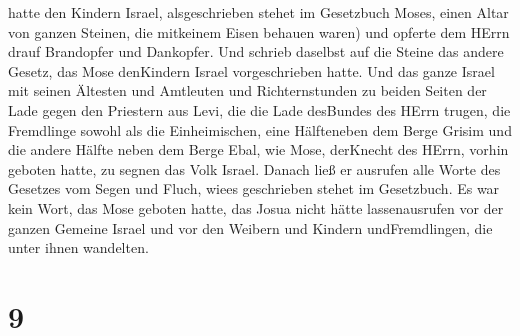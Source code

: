 hatte den Kindern Israel, alsgeschrieben stehet im Gesetzbuch Moses,
einen Altar von ganzen Steinen, die mitkeinem Eisen behauen waren) und
opferte dem HErrn drauf Brandopfer und Dankopfer.  Und
schrieb daselbst auf die Steine das andere Gesetz, das Mose denKindern
Israel vorgeschrieben hatte.  Und das ganze Israel mit
seinen Ältesten und Amtleuten und Richternstunden zu beiden Seiten der
Lade gegen den Priestern aus Levi, die die Lade desBundes des HErrn
trugen, die Fremdlinge sowohl als die Einheimischen, eine Hälfteneben
dem Berge Grisim und die andere Hälfte neben dem Berge Ebal, wie Mose,
derKnecht des HErrn, vorhin geboten hatte, zu segnen das Volk Israel.
 Danach ließ er ausrufen alle Worte des Gesetzes vom Segen
und Fluch, wiees geschrieben stehet im Gesetzbuch.  Es war
kein Wort, das Mose geboten hatte, das Josua nicht hätte lassenausrufen
vor der ganzen Gemeine Israel und vor den Weibern und Kindern
undFremdlingen, die unter ihnen wandelten.

\hypertarget{section-8}{%
\section{9}\label{section-8}}

